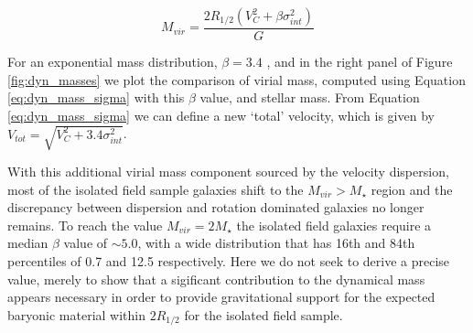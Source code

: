 \documentclass[a4paper,fleqn,usenatbib]{mn2e}
\newcommand{\Sers}{S\'{e}rsic }
\begin{document}
\begin{equation}\label{eq:dyn_mass_sigma}
   M_{vir} = \frac{2R_{1/2}\left(V_{C}^{2} + \beta\sigma_{int}^{2}\right)}{G}
\end{equation}

For an exponential mass distribution, $\beta=3.4$ \citep{Burkert2010,Newman2013}, and in the right panel of Figure \ref{fig:dyn_masses} we plot the comparison of virial mass, computed using Equation \ref{eq:dyn_mass_sigma} with this $\beta$ value, and stellar mass.
From Equation \ref{eq:dyn_mass_sigma} we can define a new `total' velocity, which is given by $V_{tot} = \sqrt{V_{C}^{2} + 3.4\sigma_{int}^{2}}$. 

With this additional virial mass component sourced by the velocity dispersion, most of the isolated field sample galaxies shift to the $M_{vir} > M_{\star}$ region and the discrepancy between dispersion and rotation dominated galaxies no longer remains.
To reach the value $M_{vir} = 2M_{\star}$ the isolated field galaxies require a median $\beta$ value of $\sim5.0$, with a wide distribution that has 16th and 84th percentiles of 0.7 and 12.5 respectively.
Here we do not seek to derive a precise value, merely to show that a sigificant contribution to the dynamical mass appears necessary in order to provide gravitational support for the expected baryonic material within $2R_{1/2}$ for the isolated field sample. 

\end{document}
